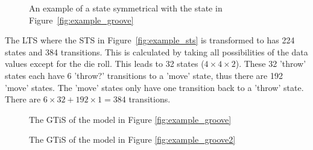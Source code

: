 \begin{figure}[h]
  \begin{center}
    
  \end{center}
  \caption{An example of a state symmetrical with the state in Figure~\ref{fig:example_groove}}
  \label{fig:symmetry_example}
\end{figure}

The LTS where the STS in Figure~\ref{fig:example_sts} is transformed to has 224 states and 384 transitions. This is calculated by taking all possibilities of the data values except for the die roll. This leads to 32 states ($4 \times 4 \times 2$). These 32 'throw' states each have 6 'throw?' transitions to a 'move' state, thus there are 192 'move' states. The 'move' states only have one transition back to a 'throw' state. There are $6 \times 32 + 192 \times 1 = 384$ transitions.

\begin{figure}[h]
  \begin{center}
    \resizebox{\textwidth}{!}{}
  \end{center}
  \caption{The GTiS of the model in Figure \ref{fig:example_groove}}
  \label{fig:statespace_groove1}
\end{figure}

\begin{figure}[h!]
  \begin{center}
    \resizebox{\textwidth}{!}{}
  \end{center}
  \caption{The GTiS of the model in Figure \ref{fig:example_groove2}}
  \label{fig:statespace_groove2}
\end{figure}
